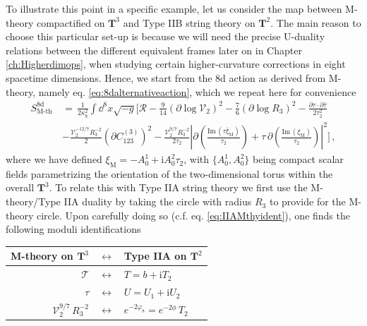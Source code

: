 To illustrate this point in a specific example, let us consider the map between M-theory compactified on $\mathbf{T}^3$ and Type IIB string theory on $\mathbf{T}^2$. The main reason to choose this particular set-up is because we will need the precise U-duality relations between the different equivalent frames later on in Chapter \ref{ch:Higherdimops}, when studying certain higher-curvature corrections in eight spacetime dimensions. Hence, we start from the 8d action as derived from M-theory, namely eq. \eqref{eq:8dalternativeaction}, which we repeat here for convenience
%
\begin{equation}\label{eq:8dap}
			\begin{aligned}
				S_\text{M-th}^{\text{8d}}\, &=\, \frac{1}{2\kappa_{8}^2} \int \dd^{8}x\sqrt{-g} \Bigg[\mathcal{R}-\frac{9}{14} \left( \partial \log \mathcal{V}_2\right)^2 - \frac{7}{6} \left( \partial \log R_3\right)^2 -\frac{\partial \tau \cdot \partial \bar \tau}{2 \tau_2^2}\\
                &- \frac{\mathcal{V}_2^{-12/7} R_3^{-2}}{2} \left( \partial C_{123}^{(3)}\right)^2 -\frac{\mathcal{V}_2^{9/7} R_3^{-2}}{2 \tau_2} \left| \partial \left( \frac{\text{Im}\, (\tau \bar{\xi}_{\text{M}})}{\tau_2}\right) + \tau\, \partial \left( \frac{\text{Im}\, (\xi_{\text{M}})}{\tau_2}\right)\right|^2\Bigg]\, ,
			\end{aligned}
\end{equation}
%
where we have defined $\xi_{\text{M}}=-A_0^{1}+\text{i} A_0^{2} \tau_2$, with $\lbrace A_0^{1}, A_0^{2} \rbrace$ being compact scalar fields parametrizing the orientation of the two-dimensional torus within the overall $\mathbf{T}^3$. To relate this with Type IIA string theory we first use the M-theory/Type IIA duality by taking the circle with radius $R_3$ to provide for the M-theory circle. Upon carefully doing so (c.f. eq. \eqref{eq:IIAMthyident}), one finds the following moduli identifications
%
\begin{center}
\renewcommand{\arraystretch}{2.00}
\begin{tabular}{r c l}
M-theory on $\mathbf{T}^3$ & $\longleftrightarrow $ & Type IIA on $\mathbf{T}^2$\\ 
\hline
\hline  
$\mathcal{T}$ & $ \longleftrightarrow$ & $T=b+\text{i} T_2$ \\
$\tau$ & $\longleftrightarrow $&  $U=U_1+\text{i} U_2$\\
$\mathcal{V}_2^{9/7}\, R_3^{-2}$ & $\longleftrightarrow $ & $e^{-2\varphi_8}=e^{-2\phi}\, T_2$
\end{tabular}\label{tab:8dMthy/IIA}
\end{center}  
